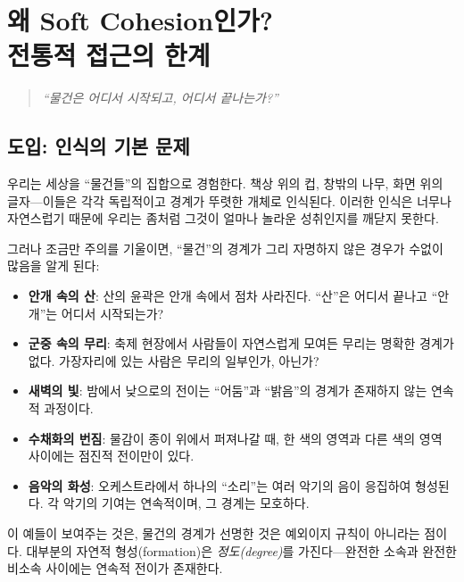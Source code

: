 
\chapter{왜 Soft Cohesion인가?\\전통적 접근의 한계}
\label{ch:motivation}

\begin{quote}
\textit{``물건은 어디서 시작되고, 어디서 끝나는가?''}
\end{quote}

\section{도입: 인식의 기본 문제}
\label{sec:intro-problem}

우리는 세상을 ``물건들''의 집합으로 경험한다. 책상 위의 컵, 창밖의 나무, 화면 위의 글자---이들은 각각 독립적이고 경계가 뚜렷한 개체로 인식된다. 이러한 인식은 너무나 자연스럽기 때문에 우리는 좀처럼 그것이 얼마나 놀라운 성취인지를 깨닫지 못한다.

그러나 조금만 주의를 기울이면, ``물건''의 경계가 그리 자명하지 않은 경우가 수없이 많음을 알게 된다:

\begin{itemize}
    \item \textbf{안개 속의 산}: 산의 윤곽은 안개 속에서 점차 사라진다. ``산''은 어디서 끝나고 ``안개''는 어디서 시작되는가?
    \item \textbf{군중 속의 무리}: 축제 현장에서 사람들이 자연스럽게 모여든 무리는 명확한 경계가 없다. 가장자리에 있는 사람은 무리의 일부인가, 아닌가?
    \item \textbf{새벽의 빛}: 밤에서 낮으로의 전이는 ``어둠''과 ``밝음''의 경계가 존재하지 않는 연속적 과정이다.
    \item \textbf{수채화의 번짐}: 물감이 종이 위에서 퍼져나갈 때, 한 색의 영역과 다른 색의 영역 사이에는 점진적 전이만이 있다.
    \item \textbf{음악의 화성}: 오케스트라에서 하나의 ``소리''는 여러 악기의 음이 응집하여 형성된다. 각 악기의 기여는 연속적이며, 그 경계는 모호하다.
\end{itemize}

이 예들이 보여주는 것은, 물건의 경계가 선명한 것은 예외이지 규칙이 아니라는 점이다. 대부분의 자연적 형성(formation)은 \emph{정도(degree)}를 가진다---완전한 소속과 완전한 비소속 사이에는 연속적 전이가 존재한다.

